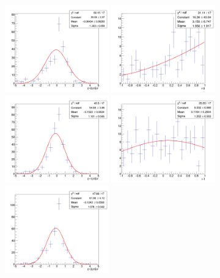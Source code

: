 \begin{figure}[!htb]
	\centering
	\includegraphics[width=0.4\textwidth]{Figures/signalInjection0_500_sigpull_3000.png}
	\includegraphics[width=0.4\textwidth]{Figures/signalInjection0_500_sigstrength_3000.png}
	\includegraphics[width=0.4\textwidth]{Figures/signalInjection1_500_sigpull_3000.png}
	\includegraphics[width=0.4\textwidth]{Figures/signalInjection1_500_sigstrength_3000.png}
	\includegraphics[width=0.4\textwidth]{Figures/signalInjection3_500_sigpull_3000.png}

\end{figure}
